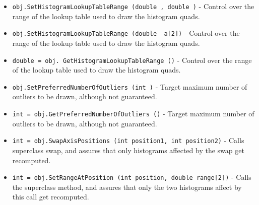\begin{itemize}
\item  \verb|obj.SetHistogramLookupTableRange (double , double )| -  Control over the range of the lookup table used to draw the histogram quads.

\item  \verb|obj.SetHistogramLookupTableRange (double  a[2])| -  Control over the range of the lookup table used to draw the histogram quads.

\item  \verb|double = obj. GetHistogramLookupTableRange ()| -  Control over the range of the lookup table used to draw the histogram quads.

\item  \verb|obj.SetPreferredNumberOfOutliers (int )| -  Target maximum number of outliers to be drawn, although not guaranteed.

\item  \verb|int = obj.GetPreferredNumberOfOutliers ()| -  Target maximum number of outliers to be drawn, although not guaranteed.

\item  \verb|int = obj.SwapAxisPositions (int position1, int position2)| -  Calls superclass swap, and assures that only histograms affected by the 
 swap get recomputed.

\item  \verb|int = obj.SetRangeAtPosition (int position, double range[2])| -  Calls the superclass method, and assures that only the two histograms
 affect by this call get recomputed.

\end{itemize}
